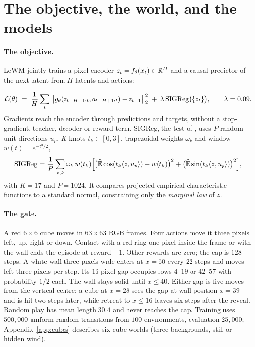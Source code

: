 \section{The objective, the world, and the models}
\label{sec:worlds}

\paragraph{The objective.} LeWM \citep{maes2026lewm} jointly trains a pixel encoder
$z_t=f_\theta(x_t)\in\mathbb{R}^D$ and a causal predictor of the next latent from $H$ latents and actions:

\begin{equation}
\label{eq:lewm}
\mathcal{L}(\theta) \;=\; \frac{1}{H}\sum_{t} \big\| g_\theta(z_{t-H+1:t}, a_{t-H+1:t}) - z_{t+1} \big\|_2^2
\;+\; \lambda \,\mathrm{SIGReg}\big(\{z_t\}\big),\qquad \lambda = 0.09 .
\end{equation}
Gradients reach the encoder through predictions and targets, without a stop-gradient, teacher, decoder
or reward term. SIGReg, the test of \citet{balestriero2025lejepa}, uses $P$
random unit directions $u_p$, $K$ knots $t_k\in[0,3]$, trapezoidal weights $\omega_k$ and window
$w(t)=e^{-t^2/2}$,
\begin{equation}
\label{eq:sigreg}
\mathrm{SIGReg} = \frac{1}{P}\sum_{p,k} \omega_k \, w(t_k)
  \Big[\big(\widehat{\mathbb{E}}\cos(t_k \langle z, u_p\rangle) - w(t_k)\big)^2
     + \big(\widehat{\mathbb{E}}\sin(t_k \langle z, u_p\rangle)\big)^2\Big],
\end{equation}
with $K=17$ and $P=1024$. It compares projected empirical characteristic functions to a standard
normal, constraining only the \emph{marginal law} of $z$.

\paragraph{The gate.} A red $6\times6$ cube moves in $63\times63$ RGB frames. Four actions move it
three pixels left, up, right or down. Contact with a red ring one pixel inside the frame or with the
wall ends the episode at reward $-1$. Other rewards are zero; the cap is $128$ steps.
A white wall three pixels wide enters at $x=60$ every $22$ steps and moves left three pixels per step.
Its $16$-pixel gap occupies rows $4$--$19$ or $42$--$57$ with probability $1/2$ each.
The wall stays solid until $x\le40$. Either gap is five moves from the vertical centre; a cube at $x=28$ sees the gap at wall position $x=39$ and is hit two steps later, while retreat to $x\le16$ leaves six steps after the reveal. Random play has mean length $30.4$ and never reaches the cap.
Training uses $500{,}000$ uniform-random transitions from $100$ environments, evaluation $25{,}000$; Appendix~\ref{app:cubes} describes six cube worlds (three backgrounds, still or hidden wind).

